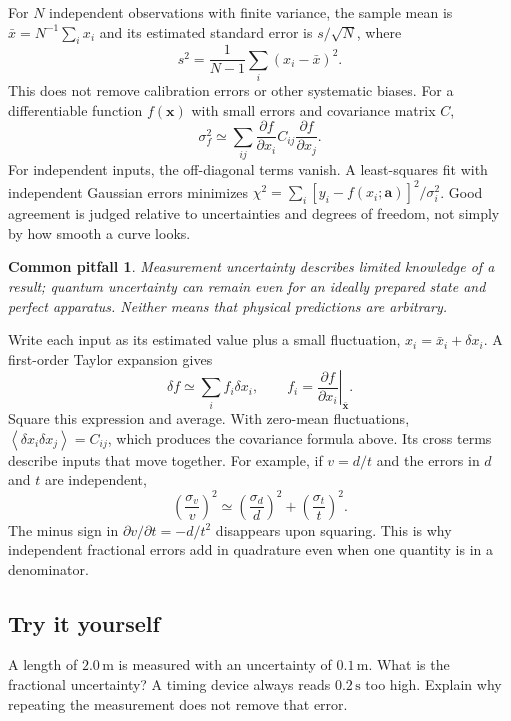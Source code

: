 \documentclass[11pt,oneside]{book}
\newcommand{\vect}[1]{\boldsymbol{#1}}
\newcommand{\avg}[1]{\left\langle #1\right\rangle}
\newcommand{\pd}[2]{\frac{\partial #1}{\partial #2}}
\theoremstyle{reviewstyle}
\newtheorem*{pitfall}{Common pitfall}
\newcommand{\learningcheck}[1]{\subsection*{Try it yourself}\noindent #1\par}
\begin{document}
For $N$ independent observations with finite variance, the sample mean is $\bar x=N^{-1}\sum_i x_i$ and its estimated standard error is $s/\sqrt N$, where
\begin{equation}
s^2=\frac{1}{N-1}\sum_i(x_i-\bar x)^2.
\end{equation}
This does not remove calibration errors or other systematic biases. For a differentiable function $f(\vect x)$ with small errors and covariance matrix $C$,
\begin{equation}
\sigma_f^2\simeq\sum_{ij}\pd{f}{x_i}C_{ij}\pd{f}{x_j}.
\end{equation}
For independent inputs, the off-diagonal terms vanish. A least-squares fit with independent Gaussian errors minimizes
$\chi^2=\sum_i[y_i-f(x_i;\vect a)]^2/\sigma_i^2$.
Good agreement is judged relative to uncertainties and degrees of freedom, not simply by how smooth a curve looks.
\begin{pitfall}
Measurement uncertainty describes limited knowledge of a result; quantum uncertainty can remain even for an ideally prepared state and perfect apparatus. Neither means that physical predictions are arbitrary.
\end{pitfall}

Write each input as its estimated value plus a small fluctuation, $x_i=\bar x_i+\delta x_i$. A first-order Taylor expansion gives
\begin{equation}
\delta f\simeq\sum_i f_i\delta x_i,\qquad
f_i=\left.\pd{f}{x_i}\right|_{\vect{\bar x}}.
\end{equation}
Square this expression and average. With zero-mean fluctuations, $\avg{\delta x_i\delta x_j}=C_{ij}$, which produces the covariance formula above. Its cross terms describe inputs that move together. For example, if $v=d/t$ and the errors in $d$ and $t$ are independent,
\begin{equation}
\left(\frac{\sigma_v}{v}\right)^2\simeq
\left(\frac{\sigma_d}{d}\right)^2+
\left(\frac{\sigma_t}{t}\right)^2.
\end{equation}
The minus sign in $\partial v/\partial t=-d/t^2$ disappears upon squaring. This is why independent fractional errors add in quadrature even when one quantity is in a denominator.

\learningcheck{A length of $2.0\,\mathrm m$ is measured with an uncertainty of $0.1\,\mathrm m$. What is the fractional uncertainty? A timing device always reads $0.2\,\mathrm s$ too high. Explain why repeating the measurement does not remove that error.}
\end{document}
